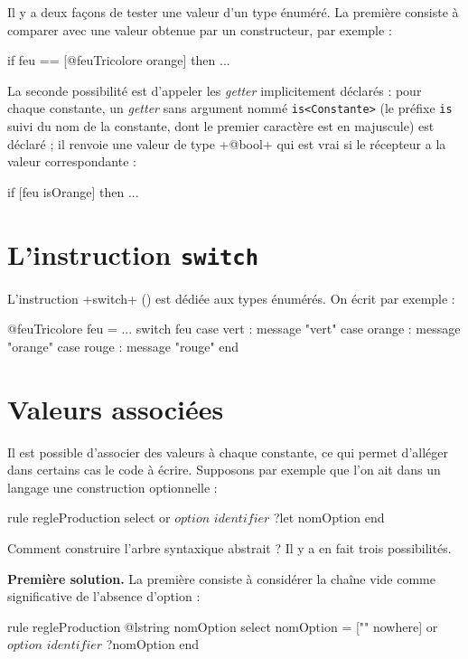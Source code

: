 
Il y a deux façons de tester une valeur d'un type énuméré. La première consiste à comparer avec une valeur obtenue par un constructeur, par exemple :
\begin{galgas}
  if feu == [@feuTricolore orange] then ...
\end{galgas}

La seconde possibilité est d'appeler les \emph{getter} implicitement déclarés : pour chaque constante, un \emph{getter} sans argument nommé  \texttt{is<Constante>} (le préfixe \texttt{is} suivi du nom de la constante, dont le premier caractère est en majuscule) est déclaré ; il renvoie une valeur de type \ggs+@bool+ qui est vrai si le récepteur a la valeur correspondante :
\begin{galgas}
  if [feu isOrange] then ...
\end{galgas}

\section{L'instruction \texttt{switch}}

L'instruction \ggs+switch+ () est dédiée aux types énumérés. On écrit par exemple :

\begin{galgas}
@feuTricolore feu = ...
switch feu
case vert : message "vert"
case orange : message "orange"
case rouge : message "rouge" 
end
\end{galgas}


\section{Valeurs associées}

Il est possible d'associer des valeurs à chaque constante, ce qui permet d'alléger dans certains cas le code à écrire. Supposons par exemple que l'on ait dans un langage une construction optionnelle :

\begin{galgas}
rule regleProduction {
  select
  or
    $option$
    $identifier$ ?let nomOption
  end
}
\end{galgas}

Comment construire l'arbre syntaxique abstrait ? Il y a en fait trois possibilités.

\textbf{Première solution.} La première consiste à considérer la chaîne vide comme significative de l'absence d'option :
\begin{galgas}
rule regleProduction {
  @lstring nomOption
  select
    nomOption = ["" nowhere]
  or
    $option$
    $identifier$ ?nomOption
  end
}
\end{galgas}


